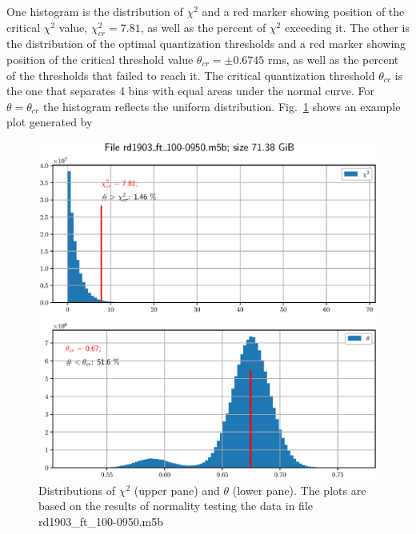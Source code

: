 \documentclass[letterpaper,twoside,12pt]{article}
\begin{document}
One histogram is the distribution of $\chi^2$ and a red marker showing position of the critical $\chi^2$ value,  $\chi^2_{cr} = 7.81$, as well as the percent of $\chi^2$ exceeding it. The other is the distribution of the optimal quantization thresholds and a red marker showing position of the critical threshold value $\theta_{cr} = \pm 0.6745$ rms, as well as the percent of the thresholds that failed to reach it. The critical quantization threshold $\theta_{cr}$ is the one that separates 4 bins with equal areas under the normal curve. For $\theta = \theta_{cr}$ the histogram reflects the uniform distribution. Fig.~\ref{chi2_and_thresh_distr} shows an example plot generated by \\

\noindent \verb@%run plot_m5b_hist.py rd1903_ft_100-0950.m5b 025@ \\


\begin{figure}[ht!]
  \begin{center}
  \includegraphics[width=35pc]{fig_chi2_and_thresh_distr.eps}
  \caption{\small Distributions of $\chi^2$ (upper pane) and $\theta$ (lower pane). The plots are based on the results of normality testing the data in file rd1903\_ft\_100-0950.m5b}
  \label{chi2_and_thresh_distr}
  \end{center}
\end{figure}
\end{document}
